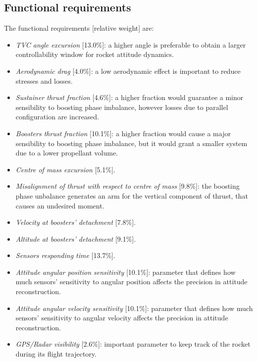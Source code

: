 \documentclass[12pt,fleqn,openany]{book} %
\begin{document}
\subsection{Functional requirements}
The functional requirements [relative weight] are: 
\begin{itemize}
 \item \textit{TVC angle excursion} [13.0\%]: a higher angle is preferable to obtain a larger controllability window for rocket attitude dynamics. 
\item \textit{Aerodynamic drag} [4.0\%]:  a low aerodynamic effect is important to reduce stresses and losses. 
\item \textit{Sustainer thrust fraction} [4.6\%]:  a higher fraction would guarantee a minor sensibility to boosting phase imbalance, however losses due to parallel configuration are increased. 
\item \textit{Boosters thrust fraction} [10.1\%]:  a higher fraction would cause a major sensibility to boosting phase imbalance, but it would grant a smaller system due to a lower propellant volume. 
\item \textit{Centre of mass excursion} [5.1\%]. 
\item \textit{Misalignment of thrust with respect to centre of mass} [9.8\%]: the boosting phase unbalance generates an arm for the vertical component of thrust, that causes an undesired moment. 
\item \textit{Velocity at boosters’ detachment} [7.8\%]. 
\item \textit{Altitude at boosters’ detachment} [9.1\%]. 
\item \textit{Sensors responding time} [13.7\%]. 
\item \textit{Attitude angular position sensitivity} [10.1\%]: parameter that defines how much sensors’ sensitivity to angular position affects the precision in attitude reconstruction. 
\item \textit{Attitude angular velocity sensitivity} [10.1\%]: parameter that defines how much sensors’ sensitivity to angular velocity affects the precision in attitude reconstruction. 
\item \textit{GPS/Radar visibility} [2.6\%]: important parameter to keep track of the rocket during its flight trajectory.  
\end{itemize}
\end{document}
